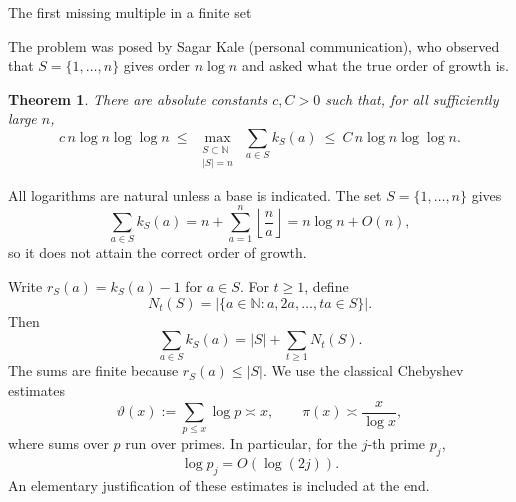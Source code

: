 \documentclass[11pt,a4paper]{article}
\newtheorem{theorem}{Theorem}
\newcommand{\N}{\mathbb N}
\begin{document}
\begin{center}
{\Large The first missing multiple in a finite set}
\end{center}
\vspace{0.5em}
\begin{abstract}
For a finite set $S$ of positive integers, let $k_S(a)$ be the least positive integer $k$ for which $ka\notin S$.
We prove that the maximum of $\sum_{a\in S}k_S(a)$ over sets of cardinality $n$ has order $n\log n\log\log n$.
The upper bound follows by compressing prime exponents and double counting prime-multiplication pairs.
A construction with separate constraints on small and large prime factors gives the matching lower bound.
\end{abstract}

The problem was posed by Sagar Kale (personal communication), who observed that $S=\{1,\dots,n\}$ gives order $n\log n$ and asked what the true order of growth is.

\begin{theorem}\label{thm:main}
There are absolute constants $c,C>0$ such that, for all sufficiently large $n$,
\[
c\,n\log n\log\log n
\ \le\ 
\max_{\substack{S\subset\N\\|S|=n}}\ \sum_{a\in S}k_S(a)
\ \le\ 
C\,n\log n\log\log n.
\]
\end{theorem}

All logarithms are natural unless a base is indicated.
The set $S=\{1,\ldots,n\}$ gives
\[
\sum_{a\in S}k_S(a)
=n+\sum_{a=1}^n\left\lfloor\frac na\right\rfloor
=n\log n+O(n),
\]
so it does not attain the correct order of growth.

Write $r_S(a)=k_S(a)-1$ for $a\in S$.
For $t\ge1$, define
\[
N_t(S)=\bigl|\{a\in\N:a,2a,\ldots,ta\in S\}\bigr|.
\]
Then
\begin{equation}\label{eq:tails}
\sum_{a\in S}k_S(a)=|S|+\sum_{t\ge1}N_t(S).
\end{equation}
The sums are finite because $r_S(a)\le |S|$.
We use the classical Chebyshev estimates
\begin{equation}\label{eq:primes}
\vartheta(x):=\sum_{p\le x}\log p\asymp x,
\qquad
\pi(x)\asymp\frac{x}{\log x},
\end{equation}
where sums over $p$ run over primes.
In particular, for the $j$-th prime $p_j$,
\begin{equation}\label{eq:nth-prime}
\log p_j=O(\log(2j)).
\end{equation}
An elementary justification of these estimates is included at the end.
\end{document}
